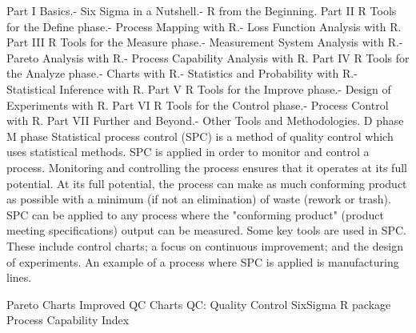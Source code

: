
Part I Basics.- Six Sigma in a Nutshell.- R from the Beginning.
Part II R Tools for the Define phase.- Process Mapping with R.- Loss Function Analysis with R.
Part III R Tools for the Measure phase.- Measurement System Analysis with R.- Pareto Analysis with R.- Process Capability Analysis with R.
Part IV R Tools for the Analyze phase.- Charts with R.- Statistics and Probability with R.- Statistical Inference with R.
Part V R Tools for the Improve phase.- Design of Experiments with R.
Part VI R Tools for the Control phase.- Process Control with R.
Part VII Further and Beyond.- Other Tools and Methodologies.
D phase
M phase
Statistical process control (SPC) is a method of quality control which uses statistical methods. SPC is applied in order to monitor and control a process. Monitoring and controlling the process ensures that it operates at its full potential. At its full potential, the process can make as much conforming product as possible with a minimum (if not an elimination) of waste (rework or trash). SPC can be applied to any process where the "conforming product" (product meeting specifications) output can be measured. Some key tools are used in SPC. These include control charts; a focus on continuous improvement; and the design of experiments.
An example of a process where SPC is applied is manufacturing lines.


Pareto Charts
Improved QC Charts
QC: Quality Control
SixSigma R package
Process Capability Index

